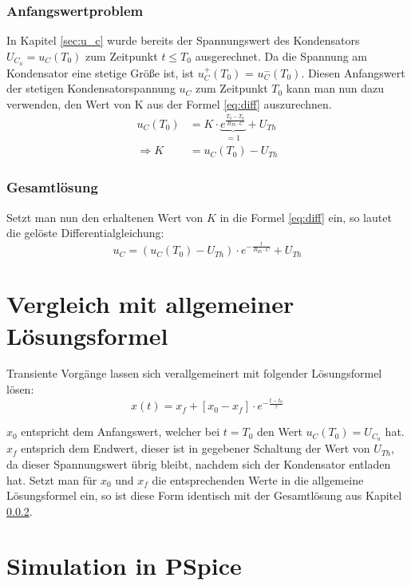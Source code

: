 \documentclass[11pt]{scrartcl}
\begin{document}
\subsubsection{Anfangswertproblem}
In Kapitel \ref{sec:u_c} wurde bereits der Spannungswert des Kondensators $U_{C_a} = u_C(T_0)$ zum Zeitpunkt $t \leq T_0$ ausgerechnet.
Da die Spannung am Kondensator eine stetige Größe ist, ist $u_C^+(T_0)$ = $u_C^-(T_0)$.
Diesen Anfangswert der stetigen Kondensatorspannung $u_C$ zum Zeitpunkt $T_0$ kann man nun dazu verwenden,
den Wert von K aus der Formel \ref{eq:diff} auszurechnen.
\begin{align*}
  u_C (T_0) &= K \cdot \underbrace{e^{\frac{T_0 - T_0}{R_{Th}\cdot C}}}_{=1} + U_{Th} \\
  \Longrightarrow K &= u_C (T_0) - U_{Th}
\end{align*}

\subsubsection{Gesamtlösung}\label{sec:sol}
Setzt man nun den erhaltenen Wert von $K$ in die Formel \ref{eq:diff} ein, so lautet die gelöste Differentialgleichung:
\begin{equation*}
  u_C = (u_C(T_0) - U_{Th}) \cdot e^{-\frac{t}{R_{Th}\cdot C}} + U_{Th}
\end{equation*}

\section{Vergleich mit allgemeiner Lösungsformel}
Transiente Vorgänge lassen sich verallgemeinert mit folgender Lösungsformel lösen:
\begin{equation*}
  x(t) = x_f + \left[ x_0 - x_f \right] \cdot e^{-\frac{t-t_0}{\tau}}
\end{equation*}

$x_0$ entspricht dem Anfangswert, welcher bei $t=T_0$ den Wert $u_C(T_0) = U_{C_a}$ hat.
$x_f$ entsprich dem Endwert, dieser ist in gegebener Schaltung der Wert von $U_{Th}$, da dieser Spannungswert übrig bleibt,
nachdem sich der Kondensator entladen hat.
Setzt man für $x_0$ und $x_f$ die entsprechenden Werte in die allgemeine Lösungsformel ein,
so ist diese Form identisch mit der Gesamtlösung aus Kapitel \ref{sec:sol}.


\newpage
\section{Simulation in PSpice}
\end{document}
